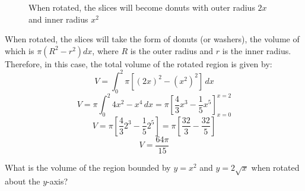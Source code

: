 \begin{figure}[H]
    \centering
    \caption{When rotated, the slices will become donuts with outer radius $2x$
    and inner radius $x^2$}
    \label{fig:donut}
\end{figure}
When rotated, the slices will take the form of donuts (or washers), the volume 
of which is $\pi \left( R^2 - r^2 \right) dx$, where $R$ is the outer radius 
and $r$ is the inner radius. Therefore, in this case, the total volume of the 
rotated region is given by:
$$V = \int_0^2 \pi \left[ \left( 2x \right)^2 - \left(x^2 \right)^2 \right]\,
dx$$
$$V = \pi \int_0^2 4x^2 - x^4\,dx = \pi \left[\frac{4}{3}x^3 - \frac{1}{5}x^5 
\right]_{x = 0}^{x = 2}$$
$$V = \pi \left[\frac{4}{3}2^3 - \frac{1}{5}2^5 \right] = \pi \left[ \frac{32}{
3} - \frac{32}{5} \right] $$
$$V = \frac{64 \pi}{15} $$

\begin{Exercise}[label = volume2]
What is the volume of the region bounded by $y = x^2$ and $y = 2\sqrt{x}$ when 
rotated about the $y$-axis? 
\end{Exercise}

